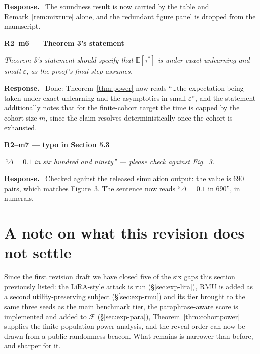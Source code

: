 \documentclass[11pt,a4paper]{article}
\newcommand{\eps}{\varepsilon}
\newcommand{\F}{\mathcal{F}}
\newenvironment{point}[1]{%
  \par\medskip\noindent\textbf{\color{rcol}#1}\par\nopagebreak\smallskip\begingroup
  \color{rcol}\itshape}{\endgroup\par}
\newenvironment{reply}{%
  \par\smallskip\noindent\textbf{\color{acol}Response.}\ \begingroup}{\endgroup\par}
\begin{document}
\begin{reply}
The soundness result is now carried by the table and Remark~\ref{rem:mixture} alone, and the redundant
figure panel is dropped from the manuscript.
\end{reply}

\begin{point}{R2--m6 --- Theorem 3's statement}
Theorem 3's statement should specify that $\mathbb{E}[\tau^*]$ is under exact unlearning
and small $\eps$, as the proof's final step assumes.
\end{point}

\begin{reply}
Done: Theorem~\ref{thm:power} now reads ``\ldots the expectation being taken under exact unlearning and
the asymptotics in small $\eps$'', and the statement additionally notes that for the
finite-cohort target the time is capped by the cohort size $m$, since the claim resolves
deterministically once the cohort is exhausted.
\end{reply}

\begin{point}{R2--m7 --- typo in Section 5.3}
``$\Delta = 0.1$ in six hundred and ninety'' --- please check against Fig.\ 3.
\end{point}

\begin{reply}
Checked against the released simulation output: the value is $690$ pairs, which matches
Figure~3. The sentence now reads ``$\Delta=0.1$ in $690$'', in numerals.
\end{reply}

\clearpage
\section*{A note on what this revision does not settle}

\noindent Since the first revision draft we have closed five of the six gaps this
section previously listed: the LiRA-style attack is run (\S\ref{sec:exp-lira}), RMU is added as a
second utility-preserving subject (\S\ref{sec:exp-rmu}) and its tier brought to the same
three seeds as the main benchmark tier, the paraphrase-aware score is implemented
and added to $\F$ (\S\ref{sec:exp-para}), Theorem~\ref{thm:cohortpower} supplies the finite-population power analysis,
and the reveal order can now be drawn from a public randomness beacon. What remains is
narrower than before, and sharper for it.
\end{document}
